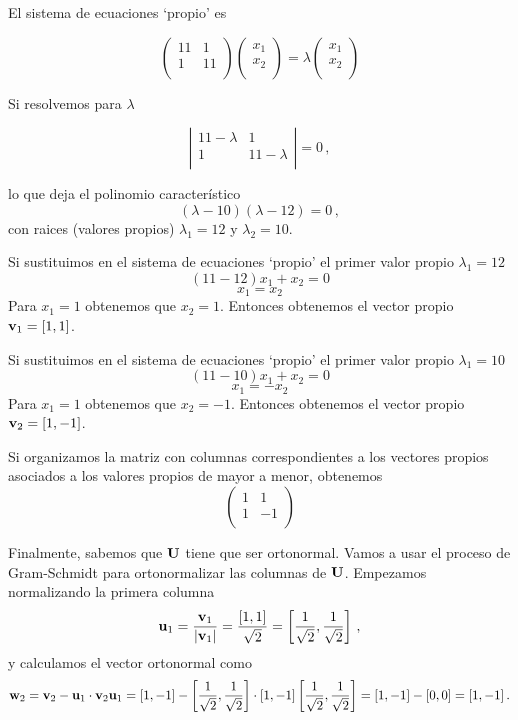 \documentclass[
]{agujournal2019}
\begin{document}
El sistema de ecuaciones `propio' es

\[\left(\begin{array}{cc}
  11 & 1 \\
  1 & 11 \\
      \end{array}\right)\left(\begin{array}{cc}
  x_1 \\
  x_2 \\
      \end{array}\right)=\lambda\left(\begin{array}{cc}
  x_1 \\
  x_2 \\
      \end{array}\right)\]

Si resolvemos para \(\lambda\)

\[\left|\begin{array}{cc}
  11-\lambda & 1 \\
  1 & 11-\lambda \\
      \end{array}\right|=0\,,\]

lo que deja el polinomio característico
\[(\lambda-10)(\lambda-12)=0\,,\] con raices (valores propios)
\(\lambda_1=12\) y \(\lambda_2=10\).

Si sustituimos en el sistema de ecuaciones `propio' el primer valor
propio \(\lambda_1=12\) \[(11-12)x_1 + x_2=0\] \[x_1=x_2\] Para
\(x_1=1\) obtenemos que \(x_2=1\). Entonces obtenemos el vector propio
\({\textbf v}_1=[1,1]\).

Si sustituimos en el sistema de ecuaciones `propio' el primer valor
propio \(\lambda_1=10\) \[(11-10)x_1 + x_2=0\] \[x_1=-x_2\] Para
\(x_1=1\) obtenemos que \(x_2=-1\). Entonces obtenemos el vector propio
\({\textbf v}_2=[1,-1]\).

Si organizamos la matriz con columnas correspondientes a los vectores
propios asociados a los valores propios de mayor a menor, obtenemos
\[\left(\begin{array}{cc}
  1 & 1 \\
  1 & -1 \\
      \end{array}\right)\]

Finalmente, sabemos que \({\textbf U}\) tiene que ser ortonormal. Vamos
a usar el proceso de Gram-Schmidt para ortonormalizar las columnas de
\({\textbf U}\). Empezamos normalizando la primera columna
\[{\textbf u}_1=\frac{{\textbf v}_1}{|{\textbf v}_1|}=\frac{[1,1]}{\sqrt{2}}=\left[ \frac{1}{\sqrt{2}}, \frac{1}{\sqrt{2}} \right]\,,\]
y calculamos el vector ortonormal como
\[{\textbf w}_2={\textbf v}_2-{\textbf u}_1\cdot{\textbf v}_2{\textbf u}_1=[1,-1]-\left[ \frac{1}{\sqrt{2}}, \frac{1}{\sqrt{2}} \right]
\cdot[1,-1]\left[ \frac{1}{\sqrt{2}}, \frac{1}{\sqrt{2}} \right]=[1,-1]-[0,0]=[1,-1]\,.\]
\end{document}
